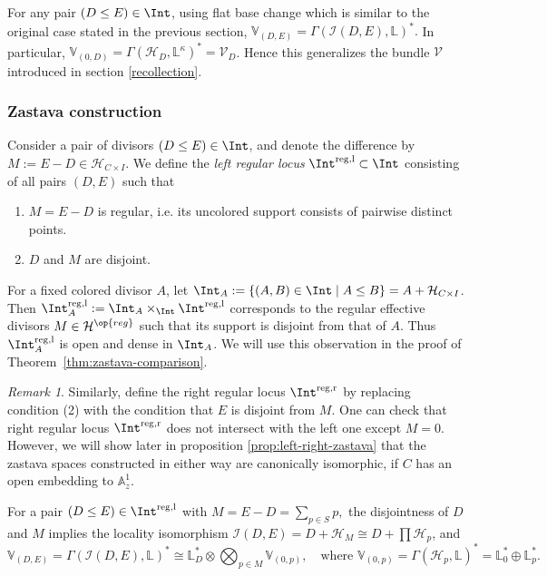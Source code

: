 \documentclass{amsart}
\numberwithin{equation}{section}
\numberwithin{figure}{section}
\theoremstyle{definition}
\theoremstyle{remark}
\newtheorem{rmk}[thm]{Remark}
\renewcommand{\c}[1]{\mathcal{#1}}
\renewcommand{\b}[1]{\mathbb{#1}}
\begin{document}
For any pair $(D\le E)\in \Int$, using flat base change which is similar to the original case stated in the previous section, 
$\b V_{(D,E)}=\Gamma(\c I(D,E),\mathbb L)^*.$
In particular, $\b V_{(0,D)}=\Gamma(\c H_D,\b L^\kappa)^*=\c V_D$. Hence this  generalizes the bundle $\c V$ introduced in section \ref{recollection}.

\subsubsection{Zastava construction}
\label{intervalzastava}
Consider a pair of divisors $(D\le E)\in\Int$, and denote the difference by $M:=E-D\in\c H_{C\times I}.$
We define the \emph{left regular locus} $\Int^{\mathrm{reg,l}}\subset\Int$ consisting of all pairs $(D,E)$ such that
\begin{enumerate}
	\item $M=E-D$ is regular, i.e. its uncolored support consists of pairwise distinct points.
	\item $D$ and $M$ are disjoint.
\end{enumerate}
For a fixed colored divisor $A$, let
$\Int_A:=\{(A,B)\in\Int\mid A\leq B\}=A+\c H_{C\times I}$.  Then $\Int^{\mathrm{reg,l}}_A:=\Int_A\times_{\Int}\Int^{\mathrm{reg,l}}$ corresponds to the regular effective divisors $M\in\c H^{\op{reg}}$ such that its support
is disjoint from that of $A$. Thus $\Int_A^{\mathrm{reg,l}}$
is open and dense in $\Int_A$. We will use this observation in the proof of Theorem~\ref{thm:zastava-comparison}.

\begin{rmk}\label{leftrightdisjoint}
Similarly, define the right regular locus $\Int^{\rm{reg,r}}$ by replacing condition (2) with the condition that $E$ is disjoint from $M$. One can check that right regular locus $\Int^{\rm{reg,r}}$ does not intersect with the left one except $M=0$. However, we will show later in proposition \ref{prop:left-right-zastava} that the zastava spaces constructed in either way are canonically isomorphic, if $C$ has an open embedding to $\b A^1_z$.
\end{rmk}

For a pair $(D\le E)\in\Int^{\mathrm{reg,l}}$ with $M = E-D = \sum_{p\in S}p,$
the disjointness of $D$ and $M$ implies the locality isomorphism
$\c I(D,E)=D+\c H_M\cong D+\prod \c H_p$, and
\[
\b V_{(D,E)}=\Gamma(\c I(D,E),\mathbb L)^*
\cong
\mathbb L_D^* \otimes
\bigotimes_{p\in M} \b V_{(0,p)},
\quad \text{where }
\b V_{(0,p)}= \Gamma(\c H_p,\mathbb L)^*=\b L^*_0\oplus \b L^*_p.
\]
\end{document}

